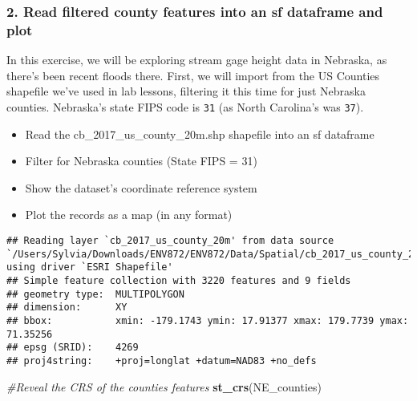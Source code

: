 \documentclass[]{article}
\newenvironment{Shaded}{\begin{snugshade}}{\end{snugshade}}
\newcommand{\KeywordTok}[1]{\textcolor[rgb]{0.13,0.29,0.53}{\textbf{#1}}}
\newcommand{\DecValTok}[1]{\textcolor[rgb]{0.00,0.00,0.81}{#1}}
\newcommand{\StringTok}[1]{\textcolor[rgb]{0.31,0.60,0.02}{#1}}
\newcommand{\CommentTok}[1]{\textcolor[rgb]{0.56,0.35,0.01}{\textit{#1}}}
\newcommand{\OperatorTok}[1]{\textcolor[rgb]{0.81,0.36,0.00}{\textbf{#1}}}
\newcommand{\NormalTok}[1]{#1}
\providecommand{\tightlist}{%
  \setlength{\itemsep}{0pt}\setlength{\parskip}{0pt}}
\begin{document}
\subsubsection{2. Read filtered county features into an sf dataframe and
plot}\label{read-filtered-county-features-into-an-sf-dataframe-and-plot}

In this exercise, we will be exploring stream gage height data in
Nebraska, as there's been recent floods there. First, we will import
from the US Counties\\
shapefile we've used in lab lessons, filtering it this time for just
Nebraska counties. Nebraska's state FIPS code is \texttt{31} (as North
Carolina's was \texttt{37}).

\begin{itemize}
\tightlist
\item
  Read the cb\_2017\_us\_county\_20m.shp shapefile into an sf dataframe
\item
  Filter for Nebraska counties (State FIPS = 31)
\item
  Show the dataset's coordinate reference system
\item
  Plot the records as a map (in any format)
\end{itemize}

\begin{Shaded}
\end{Shaded}

\begin{verbatim}
## Reading layer `cb_2017_us_county_20m' from data source `/Users/Sylvia/Downloads/ENV872/ENV872/Data/Spatial/cb_2017_us_county_20m.shp' using driver `ESRI Shapefile'
## Simple feature collection with 3220 features and 9 fields
## geometry type:  MULTIPOLYGON
## dimension:      XY
## bbox:           xmin: -179.1743 ymin: 17.91377 xmax: 179.7739 ymax: 71.35256
## epsg (SRID):    4269
## proj4string:    +proj=longlat +datum=NAD83 +no_defs
\end{verbatim}

\begin{Shaded}
\begin{Highlighting}[]
\CommentTok{#Reveal the CRS of the counties features}
\KeywordTok{st_crs}\NormalTok{(NE_counties)}
\end{Highlighting}
\end{Shaded}
\end{document}
